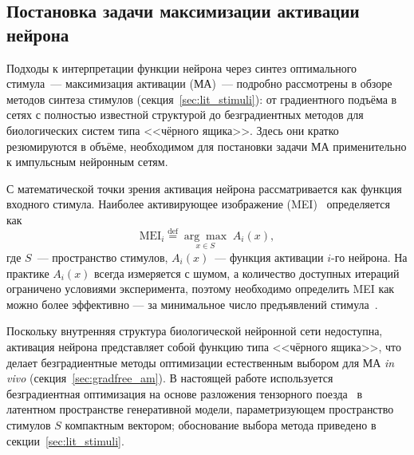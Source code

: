

\subsection{Постановка задачи максимизации активации нейрона}\label{sec:mango_problem}

Подходы к интерпретации функции нейрона через синтез оптимального стимула~--- максимизация активации (МА)~--- подробно рассмотрены в обзоре методов синтеза стимулов (секция~\ref{sec:lit_stimuli}): от градиентного подъёма в сетях с полностью известной структурой до безградиентных методов для биологических систем типа <<чёрного ящика>>. Здесь они кратко резюмируются в объёме, необходимом для постановки задачи МА применительно к импульсным нейронным сетям.

С математической точки зрения активация нейрона рассматривается как функция входного стимула. Наиболее активирующее изображение (MEI)~\cite{Inception-what-excites-neurons-most} определяется как
\begin{equation*}
    \textrm{MEI}_i \overset{\textrm{def}}{=} \underset{x \in S}{\arg\max}\; A_i(x),
\end{equation*}
где $S$~--- пространство стимулов, $A_i(x)$~--- функция активации $i$-го нейрона. На практике $A_i(x)$ всегда измеряется с шумом, а количество доступных итераций ограничено условиями эксперимента, поэтому необходимо определить MEI как можно более эффективно --- за минимальное число предъявлений стимула~\cite{ponce2019evolving}.

Поскольку внутренняя структура биологической нейронной сети недоступна, активация нейрона представляет собой функцию типа <<чёрного ящика>>, что делает безградиентные методы оптимизации естественным выбором для МА \textit{in vivo} (секция~\ref{sec:gradfree_am}). В настоящей работе используется безградиентная оптимизация на основе разложения тензорного поезда~\cite{TT-Oseledets, TTOpt-paper} в латентном пространстве генеративной модели, параметризующем пространство стимулов $S$ компактным вектором; обоснование выбора метода приведено в секции~\ref{sec:lit_stimuli}.

